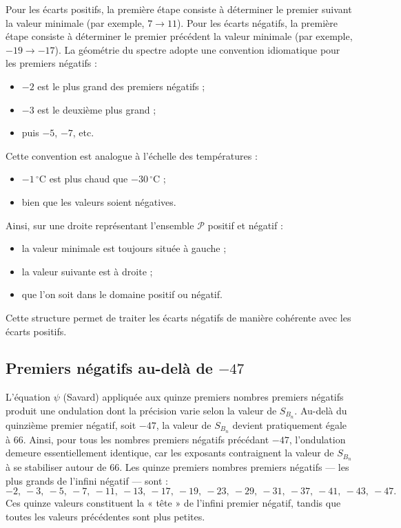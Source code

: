 \documentclass[11pt,a4paper]{article}
\begin{document}
Pour les écarts positifs, la première étape consiste à déterminer le premier suivant
la valeur minimale (par exemple, $7\to 11$). Pour les écarts négatifs, la première
étape consiste à déterminer le premier précédent la valeur minimale (par exemple,
$-19\to -17$). La géométrie du spectre adopte une convention idiomatique pour les
premiers négatifs :
\begin{itemize}[nosep]
  \item $-2$ est le plus grand des premiers négatifs ;
  \item $-3$ est le deuxième plus grand ;
  \item puis $-5$, $-7$, etc.
\end{itemize}
Cette convention est analogue à l'échelle des températures :
\begin{itemize}[nosep]
  \item $-1\,^{\circ}\mathrm{C}$ est plus chaud que $-30\,^{\circ}\mathrm{C}$ ;
  \item bien que les valeurs soient négatives.
\end{itemize}
Ainsi, sur une droite représentant l'ensemble $\mathcal{P}$ positif et négatif :
\begin{itemize}[nosep]
  \item la valeur minimale est toujours située à gauche ;
  \item la valeur suivante est à droite ;
  \item que l'on soit dans le domaine positif ou négatif.
\end{itemize}
Cette structure permet de traiter les écarts négatifs de manière cohérente avec les
écarts positifs.

\subsection*{Premiers négatifs au-delà de $-47$}

L'équation $\psi$ (Savard) appliquée aux quinze premiers nombres premiers négatifs
produit une ondulation dont la précision varie selon la valeur de $S_{B_n}$.
Au-delà du quinzième premier négatif, soit $-47$, la valeur de $S_{B_n}$ devient
pratiquement égale à $66$. Ainsi, pour tous les nombres premiers négatifs précédant
$-47$, l'ondulation demeure essentiellement identique, car les exposants contraignent
la valeur de $S_{B_n}$ à se stabiliser autour de $66$. Les quinze premiers nombres
premiers négatifs --- les plus grands de l'infini négatif --- sont :
\[
-2,\ -3,\ -5,\ -7,\ -11,\ -13,\ -17,\ -19,\ -23,\ -29,\ -31,\ -37,\ -41,\ -43,\ -47.
\]
Ces quinze valeurs constituent la « tête » de l'infini premier négatif, tandis que
toutes les valeurs précédentes sont plus petites.
\end{document}
